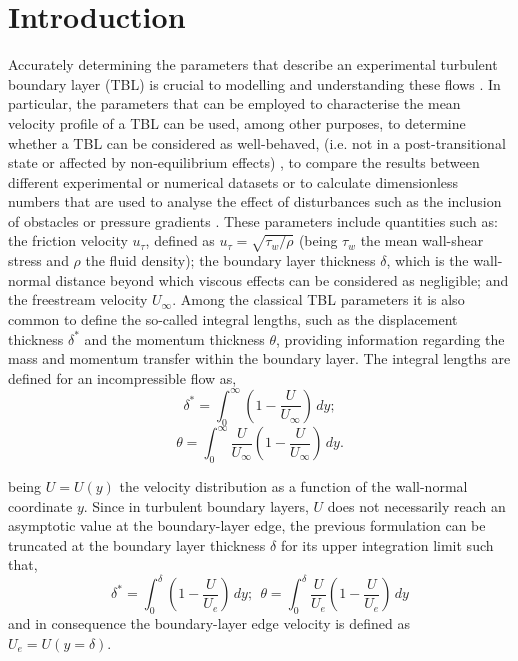 \section{Introduction}
Accurately determining the parameters that describe an experimental turbulent boundary layer (TBL) is crucial to modelling and understanding these flows \citep{titchener2015calculation,pan2020unscented}. In particular, the parameters that can be employed to characterise the mean velocity profile of a TBL can be used, among other purposes, to determine whether a TBL can be considered as well-behaved, (i.e. not in a post-transitional state or affected by non-equilibrium effects) \citep{Chauhan:2009p10824,Sanmiguel:2017JFM}, to compare the results between different experimental or numerical datasets \citep{Schlatter:2009p13969} or to calculate dimensionless numbers that are used to analyse the effect of disturbances such as the inclusion of obstacles or pressure gradients \citep{Clauser:1954p10911,guemes2019flow}. These parameters include quantities such as: the friction velocity $u_\tau$, defined as $u_\tau = \sqrt{\tau_w/\rho}$ (being $\tau_w$ the mean wall-shear stress and $\rho$ the fluid density); the boundary layer thickness $\delta$, which is the wall-normal distance beyond which viscous effects can be considered as negligible; and the freestream velocity $U_\infty$. Among the classical TBL parameters it is also common to define the so-called integral lengths, such as the displacement thickness $\delta^*$ and the momentum thickness $\theta$, providing information regarding the mass and momentum transfer within the boundary layer. The integral lengths are defined for an incompressible flow as,
\begin{equation}
    \delta^* = \int_{0}^{\infty} \left(1-\frac{U}{U_\infty}\right) \,dy;
\end{equation}
\begin{equation}
 \theta = \int_{0}^{\infty} \frac{U}{U_\infty}\left(1-\frac{U}{U_\infty}\right) \,dy.
\end{equation}

being $U = U(y)$ the velocity distribution as a function of the wall-normal coordinate $y$. Since in turbulent boundary layers, $U$ does not {necessarily reach an asymptotic value} at the boundary-layer edge, the previous formulation can be truncated at the boundary layer thickness $\delta$ for its upper integration limit such that,
\begin{equation}
\label{integral}
    \delta^* = \int_{0}^{\delta} \left(1-\frac{U}{U_e}\right) \,dy;~~ \theta = \int_{0}^{\delta} \frac{U}{U_e}\left(1-\frac{U}{U_e}\right) \,dy
\end{equation}
and in consequence the boundary-layer edge velocity is defined as $U_e = U(y=\delta)$.

